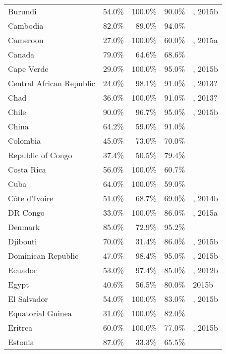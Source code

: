 \begin{longtable}{lrrrl}
  Burundi & 54.0\% & 100.0\% & 90.0\% & \cite{Unaids2016-an}, 2015b \\
  Cambodia & 82.0\% & 89.0\% & 94.0\% & \cite{Unaids2016-an} \\
  Cameroon & 27.0\% & 100.0\% & 60.0\% & \cite{Unaids2016-an}, 2015a \\
  Canada & 79.0\% & 64.6\% & 68.6\% & \cite{catie2014a,catie2014b} \\
  Cape Verde & 29.0\% & 100.0\% & 95.0\% & \cite{Unaids2016-an}, 2015b \\
  Central African Republic & 24.0\% & 98.1\% & 91.0\% & \cite{Unaids2016-an}, 2013? \\
  Chad & 36.0\% & 100.0\% & 91.0\% & \cite{Unaids2016-an}, 2013? \\
  Chile & 90.0\% & 96.7\% & 95.0\% & \cite{Unaids2016-an}, 2015b \\
  China & 64.2\% & 59.0\% & 91.0\% & \cite{Unaids2016-an, AIDSdatahub-fg, avert2013} \\
  Colombia & 45.0\% & 73.0\% & 70.0\% & \cite{ecdc2014} \\
  Republic of Congo & 37.4\% & 50.5\% & 79.4\% & \cite{Unaids2016-am} \\
  Costa Rica & 56.0\% & 100.0\% & 60.7\% & \cite{Unaids2016-an} \\
  Cuba & 64.0\% & 100.0\% & 59.0\% & \cite{Unaids2016-an} \\
  Côte d'Ivoire & 51.0\% & 68.7\% & 69.0\% & \cite{Unaids2016-an}, 2014b \\
  DR Congo & 33.0\% & 100.0\% & 86.0\% & \cite{Unaids2016-an}, 2015a \\
  Denmark & 85.0\% & 72.9\% & 95.2\% & \cite{aid2014} \\
  Djibouti & 70.0\% & 31.4\% & 86.0\% & \cite{Unaids2016-an}, 2015b \\
  Dominican Republic & 47.0\% & 98.4\% & 95.0\% & \cite{Unaids2016-an}, 2015b \\
  Ecuador & 53.0\% & 97.4\% & 85.0\% & \cite{Unaids2016-an}, 2012b \\
  Egypt & 40.6\% & 56.5\% & 80.0\% & \cite{alarab2014} 2015b \\
  El Salvador & 54.0\% & 100.0\% & 83.0\% & \cite{Unaids2016-an}, 2015b \\
  Equatorial Guinea & 31.0\% & 100.0\% & 82.0\% & \cite{Unaids2016-an} \\
  Eritrea & 60.0\% & 100.0\% & 77.0\% & \cite{Unaids2016-an}, 2015b \\
  Estonia & 87.0\% & 33.3\% & 65.5\% & \cite{chip2014}  \\

\end{longtable}

